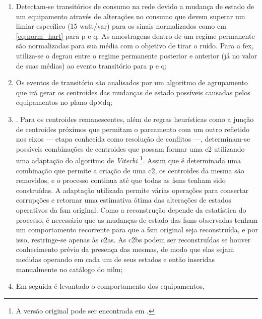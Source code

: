 \begin{enumerate}[label=\textbf{1.\arabic*},wide=\parindent]
\begin{enumerate}[label=\arabic*]
\item Detectam-se transitórios de consumo na rede devido a mudança de
estado de um equipamento através de alterações no consumo que devem
superar um limiar específico (15 \acs{watt}/\acs{var}) para os sinais
normalizados como em \ref{eq:norm_hart} para \acs{p} e \acs{q}.
As amostragens dentro de um regime permanente são normalizadas para
sua média com o objetivo de tirar o ruído. Para a \gls{fex}, utiliza-se o
degrau entre o regime permanente posterior e anterior (já no valor de
suas médias) ao evento transitório para \gls{p} e \gls{q};
\item Os eventos de transitório são analisados por um algoritmo de
agrupamento que irá gerar os centroides das mudanças de estado
possíveis causadas pelos equipamentos no plano
\acs{dp}$\times$\acs{dq};
\item {}. Para os
centroides remanescentes, além de regras heurísticas como a junção de
centroides próximos que permitam o pareamento com um outro refletido
nos eixos --- etapa conhecida como resolução de conflitos ---,
determinam-se possíveis combinações de centroides que possam formar
uma \gls{c2} utilizando uma adaptação do algoritmo de \emph{Viterbi}
\cite{nilm_bouloutas_viterbi_ext_1991_11,
nilm_hart_fsm_viterbi_1993_12}\footnote{A versão original pode ser
encontrada em \cite{viterbi_alg}.}. Assim que é determinada uma combinação
que permite a criação de uma \gls{c2}, os centroides da mesma são
removidos, e o processo continua até que todas as \glspl{fsm} tenham
sido construídas. A adaptação utilizada
\cite{nilm_bouloutas_viterbi_ext_1991_11,
nilm_hart_fsm_viterbi_1993_12} permite várias operações para consertar
corrupções e retornar uma estimativa ótima das alterações de estados
operativos da \gls{fsm} original. Como a reconstrução depende da
estatística do processo, é necessário que as mudanças de estado das
\glspl{fsm} observadas tenham um comportamento recorrente para que a \gls{fsm}
original seja reconstruída, e por isso, restringe-se apenas às
\glspl{c2a}. As \glspl{c2b} podem ser reconstruídas se houver
conhecimento prévio da presença das mesmas, de modo que elas sejam
medidas operando em cada um de seus estados e então inseridas
manualmente no catálogo do \gls{nilm};
\item Em seguida é levantado o comportamento dos equipamentos,

\end{enumerate}
\end{enumerate}

